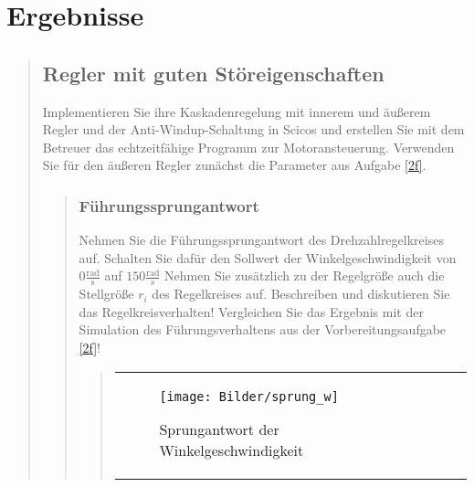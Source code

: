 \section{Ergebnisse}
\begin{quote}
    
    
    \subsection{Regler mit guten Störeigenschaften}
    Implementieren Sie ihre Kaskadenregelung mit innerem und äußerem Regler und der
    Anti-Windup-Schaltung in Scicos und erstellen Sie mit dem Betreuer das echtzeitfähige
    Programm zur Motoransteuerung. Verwenden Sie für den äußeren Regler zunächst die
    Parameter aus Aufgabe \ref{2f}.
    
    
    \begin{quote}
        
        \subsubsection{Führungssprungantwort}
        Nehmen Sie die Führungssprungantwort des Drehzahlregelkreises auf. Schalten Sie dafür den Sollwert der
        Winkelgeschwindigkeit von $0 \mathrm{\frac{rad}{s}}$ auf $150 \mathrm{\frac{rad}{s}}$ Nehmen Sie zusätzlich zu der
        Regelgröße auch die Stellgröße $r_i$ des Regelkreises auf.
        Beschreiben und diskutieren Sie das Regelkreisverhalten! Vergleichen Sie das Ergebnis mit der Simulation des
        Führungsverhaltens aus der Vorbereitungsaufgabe \ref{2f}!
        
        \begin{quote}
            
        \begin{center}
        \begin{tabular}{ll}
        
        \hspace{-4.5cm}
            \begin{minipage}{0.6\textwidth}
                
                \begin{figure}[H]
                    \label{fig:sprung_w}
                    \texttt{[image: Bilder/sprung\_w]}
                    \caption{Sprungantwort der Winkelgeschwindigkeit}
                \end{figure}
                
            \end{minipage}
            

\end{tabular}
\end{center}
\end{quote}
\end{quote}
\end{quote}
